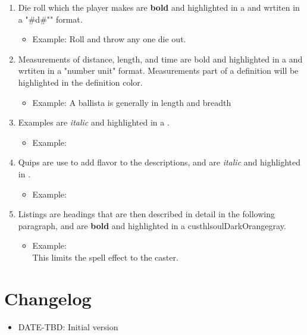 \begin{enumerate}[leftmargin=12pt]
\item Die roll which the player makes are \textbf{bold} and highlighted in a   and wrtiten in a "\#d\#"" format.
	\begin{itemize}\item Example: Roll  and throw any one die out.\end{itemize}
\item Measurements of distance, length, and time are bold and highlighted in   a and wrtiten in a "number unit" format. Measurements part of a definition will be highlighted in the definition color.
	\begin{itemize}\item Example: A ballista is generally  in length and breadth\end{itemize}
\item Examples are \textit{italic} and highlighted in a .
	\begin{itemize}\item Example: \end{itemize}
\item Quips are use to add flavor to the descriptions, and are \textit{italic} and highlighted in .
	\begin{itemize}\item Example: \end{itemize}
\item Listings are headings that are then described in detail in the following paragraph, and are \textbf{bold} and highlighted in a custhl{soulDarkOrange}{gray}.
	\begin{itemize}\item Example: \\
This limits the spell effect to the caster.\end{itemize}
\end{enumerate}
\section{Changelog}
\begin{itemize}[leftmargin=12pt]
\item DATE-TBD: Initial version
\end{itemize}